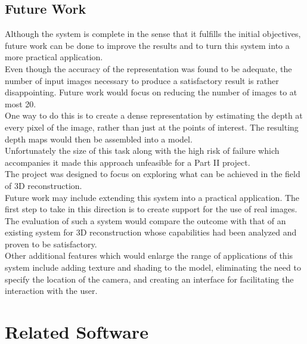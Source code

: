 \documentclass[12pt,a4paper,twoside,openright]{report}
\begin{document}
\section{Future Work}
Although the system is complete in the sense that it fulfills the initial objectives, future work can be done to improve the results and to turn this system into a more practical application. \\
\linebreak
Even though the accuracy of the representation was found to be adequate, the number of input images necessary to produce a satisfactory result is rather disappointing. Future work would focus on reducing the number of images to at most 20.\\ One way to do this is to create a dense representation by estimating the depth at every pixel of the image, rather than just at the points of interest. The resulting depth maps would then be assembled into a model.\\ Unfortunately the size of this task along with the high risk of failure which accompanies it made this approach unfeasible for a Part II project.\\
\linebreak
The project was designed to focus on exploring what can be achieved in the field of 3D reconstruction.\\ 
Future work may include extending this system into a practical application. 
The first step to take in this direction is to create support for the use of real images. The evaluation of such a system would compare the outcome with that of an existing system for 3D reconstruction whose capabilities had been analyzed and proven to be satisfactory.\\ 
Other additional features which would enlarge the range of applications of this system include adding texture and shading to the model, eliminating the need to specify the location of the camera, and creating an interface for facilitating the interaction with the user.




\appendix
\chapter{Related Software}
\end{document}
